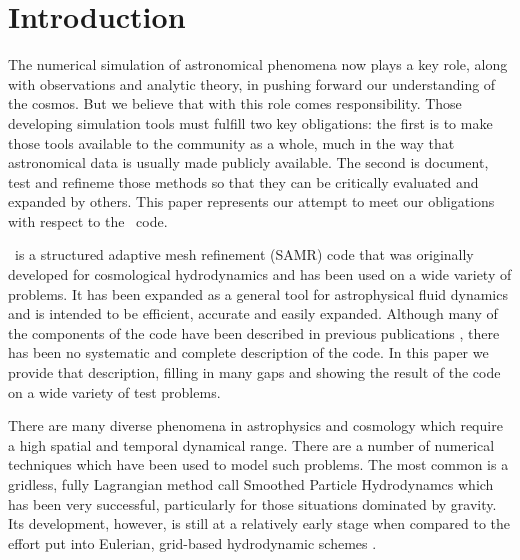 
\section{Introduction}\label{sec.intro}

The numerical simulation of astronomical phenomena now plays a key role, along with observations and analytic theory, in pushing forward our understanding of the cosmos.
But we believe that with this role comes responsibility.  Those developing simulation tools must fulfill two key obligations: the first is to make those tools available to the community as a whole, much in the way that astronomical data is usually made publicly available.  The second is document, test and refineme those methods so that they can be critically evaluated and expanded by others.  This paper represents our attempt to meet our obligations with respect to the \enzo\ code.

\enzo\ is a structured adaptive mesh refinement (SAMR) code that was originally developed for cosmological hydrodynamics and has been used on a wide variety of problems.  It has been expanded as a general tool for astrophysical fluid dynamics and is intended to be efficient, accurate and easily expanded.  Although many of the components of the code have been described in previous publications \citep{1995CoPhC..89..149B, BryanThesis96, Bryan97a, Bryan97b, Norman99, BryanCompSci99, Bryan01, Oshea04}, there has been no systematic and complete description of the code.  In this paper we provide that description, filling in many gaps and showing the result of the code on a wide variety of test problems.

There are many diverse phenomena in astrophysics and cosmology which require a high spatial and temporal dynamical range. There are a number of numerical techniques which have been used to
model such problems.  The most common is a gridless, fully Lagrangian method call Smoothed Particle Hydrodynamcs \citep[SPH;][]{Lucy77, SPH} which has been very successful, particularly for those situations dominated by gravity.  Its development, however, is still at a relatively early stage when
compared to the effort put into Eulerian, grid-based hydrodynamic schemes \citep{Woodward84}. 

